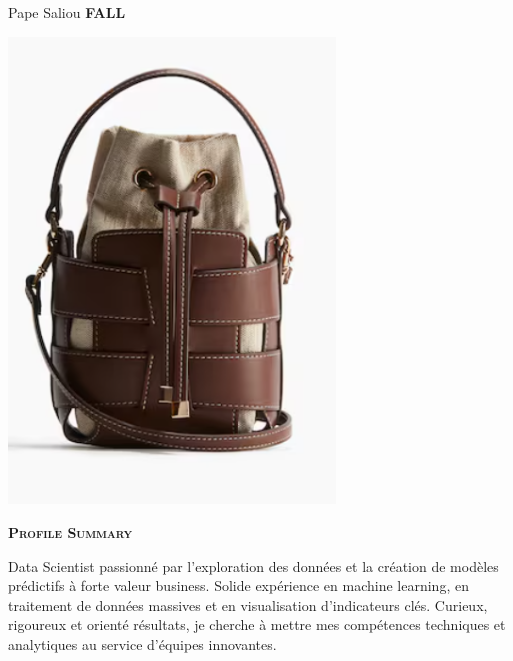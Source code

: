 \documentclass[11pt,a4paper]{article}
\newcommand{\headleft}[1]{\vspace*{3ex}\textsc{\textbf{#1}}\par%
    \vspace*{-1.5ex}\hrulefill\par\vspace*{0.7ex}}
\begin{document}
\setlength{\topskip}{0pt}\setlength{\parindent}{0pt}\setlength{\parskip}{0pt}
\setlength{\fboxsep}{0pt}\pagestyle{empty}\raggedbottom

\begin{minipage}[t]{0.33\textwidth}
\colorbox{cvblue}{\begin{minipage}[t][5mm][t]{\textwidth}\null\hfill\null\end{minipage}}
\vspace{-.2ex}
\colorbox{cvblue!90}{\color{white}
\textwidth
\begin{minipage}[t][293mm][t]{0.82\textwidth}\raggedright
\vspace*{2.5ex}

\Large Pape Saliou \textbf{\textsc{FALL}} \normalsize

\null\hfill\includegraphics[width=0.65\textwidth]{9b8366946c6e4384bb19e404f0a25a81.png}\hfill\null

\vspace*{0.5ex}

\headleft{Profile Summary}
Data Scientist passionné par l’exploration des données et la création de modèles prédictifs à forte valeur business. Solide expérience en machine learning, en traitement de données massives et en visualisation d’indicateurs clés. Curieux, rigoureux et orienté résultats, je cherche à mettre mes compétences techniques et analytiques au service d’équipes innovantes.


\end{minipage}}
\end{minipage}
\end{document}
